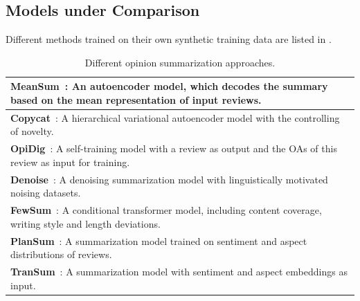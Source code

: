 \subsection{Models under Comparison}
\label{sec:base}
Different methods trained on their own synthetic training data are listed in .
\begin{table}[th]
	\scriptsize
	\centering
	\begin{tabular}{|p{7cm}|}
		\hline
		\textbf{MeanSum}~\cite{MeanSum19}: An autoencoder model, which decodes the summary based on the mean representation of input reviews. \\
		\hline
		\textbf{Copycat}~\cite{Copycat20}:  A hierarchical variational autoencoder model with the controlling of novelty. \\
		\hline 
		\textbf{OpiDig}~\cite{OpiDig20}: A self-training model with a review as output and the OAs of this review as input for training. \\
		\hline
		\textbf{Denoise}~\cite{Denoise20}: A denoising summarization model with linguistically motivated noising datasets. \\
		\hline
		\textbf{FewSum}~\cite{Fewshot20}:  A conditional transformer model, including content coverage, writing style and length deviations. \\
		\hline
		\textbf{PlanSum}~\cite{Plansum20}: A summarization model trained on sentiment and aspect distributions of  reviews. \\
		\hline
		\textbf{TranSum}~\cite{transsum21}: A summarization model with sentiment and aspect embeddings as input. \\
		\hline 
	\end{tabular}
	\caption{Different opinion summarization approaches.}
	\label{tab:base}
\end{table}

